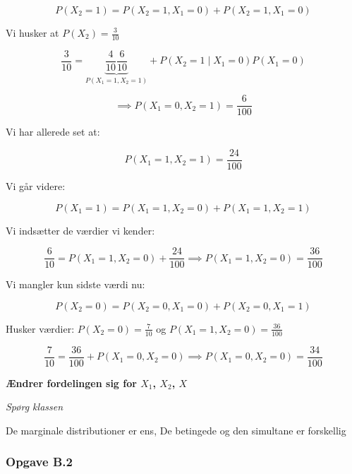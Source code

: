 \begin{equation}
    P(X_2 = 1) = P(X_2 = 1, X_1 =0) + P(X_2 = 1, X_1 = 0)  
\end{equation}

Vi husker at $P(X_2) = \frac{3}{10}$

\begin{equation}
    \frac{3}{10}= \underset{P(X_1 = 1, X_2 =1)}{\underbrace{\frac{4}{10} \frac{6}{10}}} + P(X_2 =1 \mid X_1 = 0 )P(X_1 = 0)
\end{equation}

\begin{equation}
    \implies P(X_1=0 , X_2 =1) = \frac{6}{100}
\end{equation}

Vi har allerede set at:

\begin{equation}
    P(X_1 = 1, X_2 = 1) = \frac{24}{100}
\end{equation}

Vi går videre:

\begin{equation}
    P(X_1 = 1) = P(X_1 = 1, X_2 = 0) + P(X_1 = 1, X_2 =1)
\end{equation}

Vi indsætter de værdier vi kender:

\begin{equation}
    \frac{6}{10} =   P(X_1 = 1, X_2 = 0) + \frac{24}{100} \implies P(X_1 = 1, X_2 = 0) = \frac{36}{100}
\end{equation}

Vi mangler kun sidste værdi nu:

\begin{equation}
    P(X_2 = 0) = P(X_2=0, X_1=0) + P(X_2=0, X_1 = 1)
\end{equation}

Husker værdier: $P(X_2 = 0) = \frac{7}{10}$ og $P(X_1 = 1, X_2 = 0) = \frac{36}{100}$

\begin{equation}
    \frac{7}{10} = \frac{36}{100} + P(X_1 =0, X_2=0) \implies P(X_1 = 0, X_2=0) = \frac{34}{100}
\end{equation}{}

\textbf{Ændrer fordelingen sig for $X_1$, $X_2$, $X$}

\textit{Spørg klassen}

De marginale distributioner er ens,
De betingede og den simultane er forskellig

\subsubsection{Opgave B.2}

